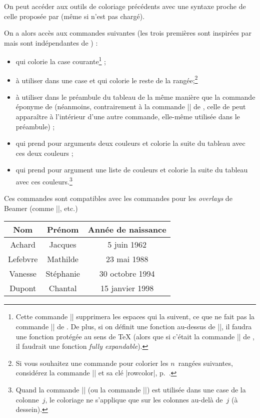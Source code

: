 \documentclass[dvipsnames]{article}%
\begin{document}
On peut accéder aux outils de coloriage précédents avec une syntaxe proche de
celle proposée par  (même si  n'est pas chargé).

On a alors accès aux commandes suivantes (les trois premières sont inspirées par
 mais sont indépendantes de ) :
\begin{itemize}
\item {} qui colorie la case courante\footnote{Cette
  commande |\cellcolor| supprimera les espaces qui la suivent, ce que ne fait
  pas la commande |\cellcolor| de . De plus, si on définit une
  fonction au-dessus de |\cellcolor|, il faudra une fonction protégée au sens de
TeX (alors que si c'était la commande |\cellcolor| de , il
faudrait une fonction \emph{fully expandable}).} ;
\item {} à utiliser dans une case et qui colorie le
reste de la rangée;\footnote{Si vous souhaitez une commande pour colorier les
  $n$~rangées suivantes, considérez la commande |\RowStyle| et sa clé
  |rowcolor|, p.~\pageref{RowStyle}.} 
\item {} à utiliser dans le préambule du tableau
de la même manière que la commande éponyme de  (néanmoins,
contrairement à la commande |\columncolor| de , celle de
 peut apparaître à l'intérieur d'une autre commande, elle-même
utilisée dans le préambule) ;
\item {} qui prend pour arguments deux couleurs et
colorie la suite du tableau avec ces deux couleurs ;
\item {} qui prend pour argument une liste de
couleurs et colorie la suite du tableau avec ces couleurs.\footnote{Quand la
  commande |\rowlistcolors| (ou la commande |\rowcolors|) est utilisée dans une
  case de la colonne~$j$, le coloriage ne s'applique que sur les colonnes
  au-delà de~$j$ (à dessein).}
\end{itemize}
Ces commandes sont compatibles avec les commandes pour les \emph{overlays} de
Beamer (comme |\only|, etc.)

\medskip
\begin{Code}
\NewDocumentCommand { \Blue } { } {\emph{}}
\begin{NiceTabular}{>{\Blue}c>{\Blue}cc}
\toprule
\emph{}
Nom & Prénom & Année de naissance \\
\midrule
Achard & Jacques & 5 juin 1962 \\
Lefebvre & Mathilde & 23 mai 1988 \\
Vanesse & Stéphanie & 30 octobre 1994 \\
Dupont & Chantal & 15 janvier 1998 \\
\bottomrule
\end{NiceTabular}
\end{Code}
\end{document}
